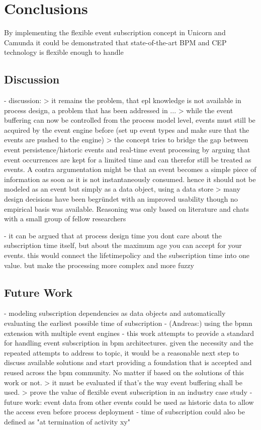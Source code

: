 \chapter{Conclusions}\label{ch:conclusion}



By implementing the flexible event subscription concept in Unicorn and Camunda it could be demonstrated that state-of-the-art BPM and CEP technology is flexible enough to handle 

\section{Discussion}

- discussion:
> it remains the problem, that epl knowledge is not available in process design, a problem that has been addressed in ...
> while the event buffering can now be controlled from the process model level, events must still be acquired by the event engine before (set up event types and make sure that the events are pushed to the engine)
> the concept tries to bridge the gap between event persistence/historic events and real-time event processing by arguing that event occurrences are kept for a limited time and can therefor still be treated as events. A contra argumentation might be that an event becomes a simple piece of information as soon as it is not instantaneously consumed. hence it should not be modeled as an event but simply as a data object, using a data store
> many design decisions have been begründet with an improved usability though no empirical basis was available. Reasoning was only based on literature and chats with a small group of fellow researchers

- it can be argued that at process design time you dont care about the subscription time itself, but about the maximum age you can accept for your events. this would connect the lifetimepolicy and the subscription time into one value. but make the processing more complex and more fuzzy

\section{Future Work}

- modeling subscription dependencies as data objects and automatically evaluating the earliest possible time of subscription
- (Andreas:) using the bpmn extension with multiple event engines
- this work attempts to provide a standard for handling event subscription in bpm architectures. given the necessity and the repeated attempts to address to topic, it would be a reasonable next step to discuss available solutions and start providing a foundation that is accepted and reused across the bpm community. No matter if based on the solutions of this work or not.
> it must be evaluated if that's the way event buffering shall be used. > prove the value of flexible event subscription in an industry case study
- future work: event data from other events could be used as historic data to allow the access even before process deployment
- time of subscription could also be defined as "at termination of activity xy"